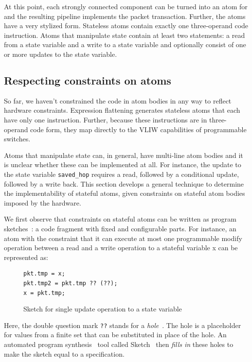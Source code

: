 At this point, each strongly connected component can be turned into an atom for
\absmachine and the resulting pipeline implements the packet transaction.
Further, the atoms have a very stylized form. Stateless atoms contain exactly
one three-operand code instruction. Atoms that manipulate state contain at
least two statements: a read from a state variable and a write to a state
variable and optionally consist of one or more updates to the state variable.

\subsection{Respecting constraints on atoms}

So far, we haven't constrained the code in atom bodies in any way to reflect
hardware constraints. Expression flattening generates stateless atoms that each
have only one instruction. Further, because these instructions are in
three-operand code form, they map directly to the VLIW capabilities of
programmable switches.

Atoms that manipulate state can, in general, have multi-line atom bodies and it
is unclear whether these can be implemented at all. For instance, the update to
the state variable \texttt{saved\_hop} requires a read, followed by a
conditional update, followed by a write back. This section develops a general
technique to determine the implementability of stateful atoms, given
constraints on stateful atom bodies imposed by the hardware.

We first observe that constraints on stateful atoms can be written as program
sketches~\cite{bitstreaming, finite, sketch_manual}: a code fragment with fixed
and configurable parts. For instance, an atom with the constraint that it can
execute at most one programmable modify operation between a read and a write
operation to a stateful variable x can be represented as:
\begin{figure}
\begin{tiny}
\begin{lstlisting}
pkt.tmp = x;
pkt.tmp2 = pkt.tmp ?? (??);
x = pkt.tmp;
\end{lstlisting}
\end{tiny}
\caption{Sketch for single update operation to a state variable}
\label{fig:sketch_for_state}
\end{figure}
Here, the double question mark \texttt{??} stands for a
\textit{hole}~\cite{sketch_manual}. The hole is a placeholder for values from a
finite set that can be substituted in place of the hole. An automated program
synthesis~\cite{synthesis} tool called Sketch~\cite{sketch_manual} then
\textit{fills in} these holes to make the sketch equal to a specification.

